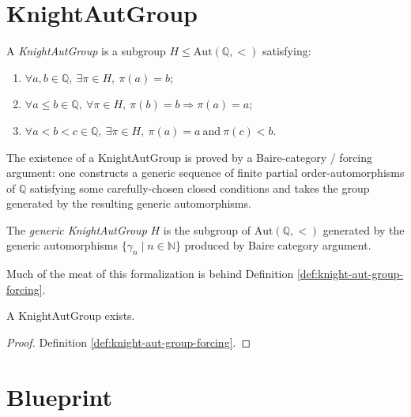 \section{KnightAutGroup}\label{sec:knight-aut-group}

\begin{definition}[KnightAutGroup]
  \label{def:knight-aut-group}
  \leanok
  A \emph{KnightAutGroup} is a subgroup $H \le \mathrm{Aut}(\mathbb{Q}, {<})$ satisfying:
  \begin{enumerate}
  \item $\forall a, b \in \mathbb{Q},\ \exists \pi \in H,\ \pi(a) = b$;
  \item $\forall a \le b \in \mathbb{Q},\ \forall \pi \in H,\ \pi(b) = b \Rightarrow \pi(a) = a$;
  \item $\forall a < b < c \in \mathbb{Q},\ \exists \pi \in H,\ \pi(a) = a \ \text{and} \ \pi(c) < b$.
\end{enumerate}
\end{definition}

The existence of a KnightAutGroup is proved by a Baire-category / forcing argument:
one constructs a generic sequence of finite partial order-automorphisms of $\mathbb{Q}$ satisfying some carefully-chosen closed conditions and takes the group generated by the resulting generic automorphisms.

\begin{definition}
  \label{def:knight-aut-group-forcing}
  \leanok
  The \emph{generic KnightAutGroup} $H$ is the subgroup of $\mathrm{Aut}(\mathbb{Q}, {<})$ generated by the generic automorphisms $\{\gamma_n \mid n \in \mathbb{N}\}$ produced by Baire category argument.
\end{definition}

Much of the meat of this formalization is behind Definition \ref{def:knight-aut-group-forcing}.

\begin{theorem}
  \label{thm:knight-aut-group}
  A KnightAutGroup exists.
\end{theorem}

\begin{proof}
Definition \ref{def:knight-aut-group-forcing}.
\end{proof}


\section{Blueprint}\label{sec:blueprint}

